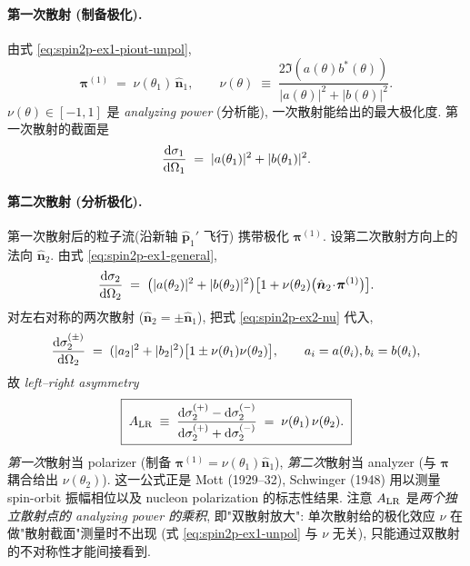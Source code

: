 \paragraph{第一次散射 (制备极化).} 由式 \eqref{eq:spin2p-ex1-piout-unpol},
\begin{equation}
  \bm\pi^{(1)}\;=\;\nu(\theta_1)\,\hat{\bm n}_1,\qquad
  \nu(\theta)\;\equiv\;\frac{2\Im(a(\theta)b^*(\theta))}{|a(\theta)|^2+|b(\theta)|^2}.
  \label{eq:spin2p-ex2-nu}
\end{equation}
$\nu(\theta)\in[-1,1]$ 是 \emph{analyzing power} (分析能), 一次散射能给出的最大极化度. 第一次散射的截面是
\begin{equation}
  \frac{\mathrm{d}\sigma_1}{\mathrm{d}\Omega_1}\;=\;|a(\theta_1)|^2+|b(\theta_1)|^2.
\end{equation}

\paragraph{第二次散射 (分析极化).} 第一次散射后的粒子流(沿新轴 $\hat{\bm p}_1'$ 飞行) 携带极化 $\bm\pi^{(1)}$. 设第二次散射方向上的法向 $\hat{\bm n}_2$. 由式 \eqref{eq:spin2p-ex1-general},
\begin{equation}
  \frac{\mathrm{d}\sigma_2}{\mathrm{d}\Omega_2}\;=\;\bigl(|a(\theta_2)|^2+|b(\theta_2)|^2\bigr)\bigl[1+\nu(\theta_2)\bigl(\hat{\bm n}_2\!\cdot\!\bm\pi^{(1)}\bigr)\bigr].
\end{equation}
对左右对称的两次散射 ($\hat{\bm n}_2=\pm\hat{\bm n}_1$), 把式 \eqref{eq:spin2p-ex2-nu} 代入,
\begin{equation}
  \frac{\mathrm{d}\sigma_2^{(\pm)}}{\mathrm{d}\Omega_2}\;=\;(|a_2|^2+|b_2|^2)\bigl[1\pm\nu(\theta_1)\nu(\theta_2)\bigr],\qquad a_i=a(\theta_i),b_i=b(\theta_i),
\end{equation}
故 \emph{left--right asymmetry}
\begin{equation}
  \boxed{\;A_{\rm LR}\;\equiv\;\frac{\mathrm{d}\sigma_2^{(+)}-\mathrm{d}\sigma_2^{(-)}}{\mathrm{d}\sigma_2^{(+)}+\mathrm{d}\sigma_2^{(-)}}\;=\;\nu(\theta_1)\,\nu(\theta_2).\;}
  \label{eq:spin2p-ex2-asymmetry}
\end{equation}
\emph{第一次}散射当 polarizer (制备 $\bm\pi^{(1)}=\nu(\theta_1)\hat{\bm n}_1$), \emph{第二次}散射当 analyzer (与 $\bm\pi$ 耦合给出 $\nu(\theta_2)$). 这一公式正是 Mott (1929--32), Schwinger (1948) 用以测量 spin-orbit 振幅相位以及 nucleon polarization 的标志性结果. 注意 $A_{\rm LR}$ 是\emph{两个独立散射点的 analyzing power 的乘积}, 即"双散射放大": 单次散射给的极化效应 $\nu$ 在做"散射截面"测量时不出现 (式 \eqref{eq:spin2p-ex1-unpol} 与 $\nu$ 无关), 只能通过双散射的不对称性才能间接看到.

